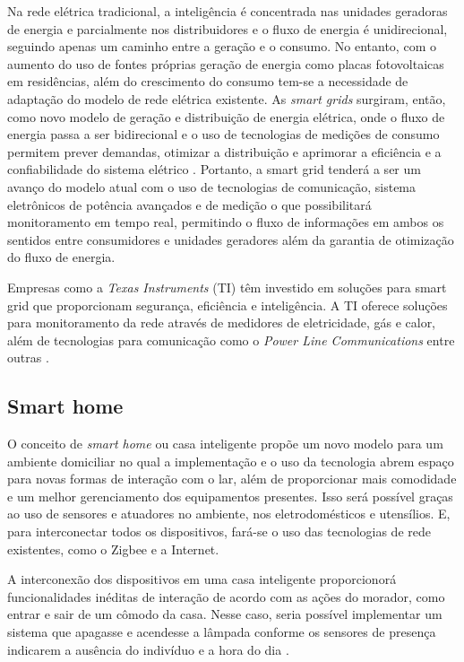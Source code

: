 Na rede elétrica tradicional, a inteligência é concentrada nas unidades geradoras de energia e parcialmente nos distribuidores e o fluxo de energia é unidirecional, seguindo apenas um caminho entre a geração e o consumo. No entanto, com o aumento do uso de fontes próprias geração de energia como placas fotovoltaicas em residências, além do crescimento do consumo tem-se a necessidade de adaptação do modelo de rede elétrica existente. As \textit{smart grids} surgiram, então, como novo modelo de geração e distribuição de energia elétrica, onde o fluxo de energia passa a ser bidirecional e o uso de tecnologias de medições de consumo permitem prever demandas, otimizar a distribuição e aprimorar a eficiência e a confiabilidade do sistema elétrico \cite{Cecilia2016}. Portanto, a smart grid tenderá a ser um avanço do modelo atual com o uso de tecnologias de comunicação, sistema eletrônicos de potência avançados e de medição o que possibilitará monitoramento em tempo real, permitindo o fluxo de informações em ambos os sentidos entre consumidores e unidades geradores além da garantia de otimização do fluxo de energia.

Empresas como a \textit{Texas Instruments} (TI) têm investido em soluções para smart grid que proporcionam segurança, eficiência e inteligência. A TI oferece soluções para monitoramento da rede através de medidores de eletricidade, gás e calor, além de tecnologias para comunicação como o 
\textit{Power Line Communications} entre outras \cite{TexasInstruments2017}.

\subsection{Smart home}

O conceito de \textit{smart home} ou casa inteligente propõe um novo modelo para um ambiente domiciliar no qual a implementação e o uso da tecnologia abrem espaço para novas formas de interação com o lar, além de proporcionar mais comodidade e um melhor gerenciamento dos equipamentos presentes. Isso será possível graças ao uso de sensores e atuadores no ambiente, nos eletrodomésticos e utensílios. E, para interconectar todos os dispositivos, fará-se o uso das tecnologias de rede existentes, como o Zigbee e a Internet.

A interconexão dos dispositivos em uma casa inteligente proporcionorá funcionalidades inéditas de interação de acordo com as ações do morador, como entrar e sair de um cômodo da casa. Nesse caso, seria possível implementar um sistema que apagasse e acendesse a lâmpada conforme os sensores de presença indicarem a ausência do indivíduo e a hora do dia \cite{DeSilva2012}.

